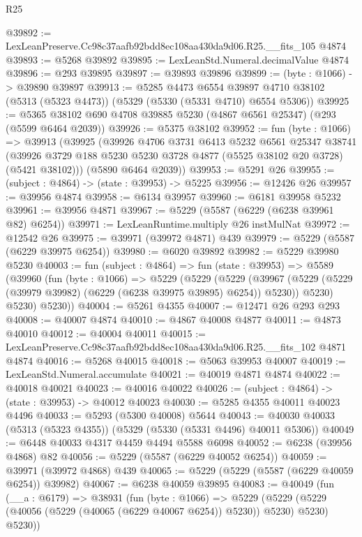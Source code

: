 \begin{lexlean}{R25}
\begin{coremodule}
@39892 := LexLeanPreserve.Cc98c37aafb92bdd8ec108aa430da9d06.R25.__fits_105 @4874
@39893 := @5268 @39892
@39895 := LexLeanStd.Numeral.decimalValue @4874
@39896 := @293 @39895
@39897 := @39893 @39896
@39899 := (byte : @1066) -> @39890 @39897
@39913 := @5285
    @4473
    @6554
    @39897
    @4710
    @38102
    (@5313 (@5323 @4473))
    (@5329 (@5330 (@5331 @4710) @6554 @5306))
@39925 := @5365 @38102 @690 @4708 @39885 @5230 (@4867 @6561 @25347) (@293 (@5599 @6464 @2039))
@39926 := @5375 @38102
@39952 := fun (byte : @1066) =>
  @39913
    (@39925
      (@39926
        @4706
        @3731
        @6413
        @5232
        @6561
        @25347
        @38741
        (@39926 @3729 @188 @5230 @5230 @3728 @4877 (@5525 @38102 @20 @3728) (@5421 @38102)))
      (@5890 @6464 @2039))
@39953 := @5291 @26
@39955 := (subject : @4864) -> (state : @39953) -> @5225
@39956 := @12426 @26
@39957 := @39956 @4874
@39958 := @6134 @39957
@39960 := @6181 @39958 @5232
@39961 := @39956 @4871
@39967 := @5229 (@5587 (@6229 (@6238 @39961 @82) @6254))
@39971 := LexLeanRuntime.multiply @26 instMulNat
@39972 := @12542 @26
@39975 := @39971 (@39972 @4871) @439
@39979 := @5229 (@5587 (@6229 @39975 @6254))
@39980 := @6020 @39892
@39982 := @5229 @39980 @5230
@40003 := fun (subject : @4864) =>
  fun (state : @39953) =>
  @5589
    (@39960
      (fun (byte : @1066) =>
      @5229
        (@5229
          (@5229
            (@39967 (@5229 (@5229 (@39979 @39982) (@6229 (@6238 @39975 @39895) @6254)) @5230))
            @5230)
          @5230)
        @5230))
@40004 := @5261 @4355
@40007 := @12471 @26 @293 @293
@40008 := @40007 @4874
@40010 := @4867 @40008 @4877
@40011 := @4873 @40010
@40012 := @40004 @40011
@40015 := LexLeanPreserve.Cc98c37aafb92bdd8ec108aa430da9d06.R25.__fits_102 @4871 @4874
@40016 := @5268 @40015
@40018 := @5063 @39953 @40007
@40019 := LexLeanStd.Numeral.accumulate
@40021 := @40019 @4871 @4874
@40022 := @40018 @40021
@40023 := @40016 @40022
@40026 := (subject : @4864) -> (state : @39953) -> @40012 @40023
@40030 := @5285 @4355 @40011 @40023 @4496
@40033 := @5293 (@5300 @40008) @5644
@40043 := @40030 @40033 (@5313 (@5323 @4355)) (@5329 (@5330 (@5331 @4496) @40011 @5306))
@40049 := @6448 @40033 @4317 @4459 @4494 @5588 @6098
@40052 := @6238 (@39956 @4868) @82
@40056 := @5229 (@5587 (@6229 @40052 @6254))
@40059 := @39971 (@39972 @4868) @439
@40065 := @5229 (@5229 (@5587 (@6229 @40059 @6254)) @39982)
@40067 := @6238 @40059 @39895
@40083 := @40049
    (fun (__a : @6179) =>
    @38931
      (fun (byte : @1066) =>
      @5229 (@5229 (@5229 (@40056 (@5229 (@40065 (@6229 @40067 @6254)) @5230)) @5230) @5230) @5230))

\end{coremodule}
\end{lexlean}

